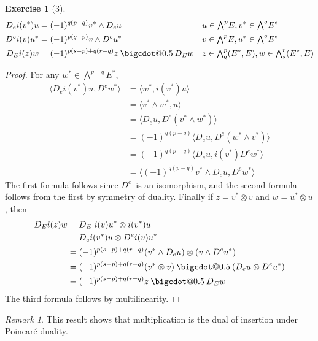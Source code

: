 \documentclass[letterpaper,12pt]{article}
\makeatletter
\newcommand{\bigcdot}[1]{\mathbin{\mathpalette\bigcdot@{#1}}}
\newcommand{\bigcdot@}[2]{%
  \sbox0{$#1\vcenter{}$}%
  \sbox2{$#1\cdot\m@th$}%
  \hbox{%
    \hfil
    \raise\ht0\hbox{%
      \scalebox{#2}{%
        \lower\ht0\hbox{$#1\bullet\m@th$}%
      }%
    }%
    \hfil
  }%
}
\newcommand{\tprod}{\otimes}
\newcommand{\eprod}{\wedge}
\newcommand{\bigeprod}{\bigwedge}
\newcommand{\medeprod}{{\textstyle\bigeprod}}
\newcommand{\mprod}{\bigcdot{0.5}}
\newcommand{\sprod}[2]{\langle#1,#2\rangle}
\theoremstyle{definition}
\newtheorem*{exer}{Exercise}
\theoremstyle{remark}
\newtheorem*{rmk}{Remark}
\makeatother
\begin{document}
\begin{exer}[3]
\begin{align*}
D_e i(v^*)u&=(-1)^{q(p-q)}v^*\eprod D_eu&&u\in\medeprod^p E,v^*\in\medeprod^q E^*\\
D^e i(v)u^*&=(-1)^{p(q-p)}v\eprod D^e u^*&&v\in\medeprod^p E,u^*\in\medeprod^q E^*\\
D_E i(z)w&=(-1)^{p(s-p)+q(r-q)}z\mprod D_Ew&&z\in\medeprod^p_q(E^*,E),w\in\medeprod^r_s(E^*,E)
\end{align*}
\end{exer}
\begin{proof}
For any \(w^*\in\medeprod^{p-q}E^*\),
\begin{align*}
\sprod{D_e i(v^*)u}{D^e w^*}&=\sprod{w^*}{i(v^*)u}\\
	&=\sprod{v^*\eprod w^*}{u}\\
	&=\sprod{D_e u}{D^e(v^*\eprod w^*)}\\
	&=(-1)^{q(p-q)}\sprod{D_e u}{D^e(w^*\eprod v^*)}\\
	&=(-1)^{q(p-q)}\sprod{D_e u}{i(v^*)D^e w^*}\\
	&=\sprod{(-1)^{q(p-q)}v^*\eprod D_e u}{D^e w^*}
\end{align*}
The first formula follows since \(D^e\)~is an isomorphism, and the second formula follows from the first by symmetry of duality. Finally if \(z=v^*\tprod v\) and \(w=u^*\tprod u\), then
\begin{align*}
D_E i(z)w&=D_E[i(v)u^*\tprod i(v^*)u]\\
	&=D_e i(v^*)u\tprod D^e i(v)u^*\\
	&=(-1)^{p(s-p)+q(r-q)}(v^*\eprod D_e u)\tprod(v\eprod D^e u^*)\\
	&=(-1)^{p(s-p)+q(r-q)}(v^*\tprod v)\mprod(D_e u\tprod D^e u^*)\\
	&=(-1)^{p(s-p)+q(r-q)}z\mprod D_E w
\end{align*}
The third formula follows by multilinearity.
\end{proof}
\begin{rmk}
This result shows that multiplication is the dual of insertion under Poincar\'e duality.
\end{rmk}
\end{document}
